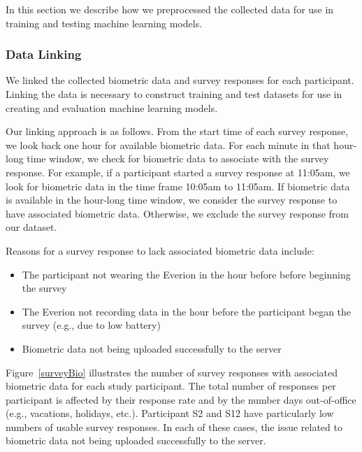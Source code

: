 In this section we describe how we preprocessed the collected data for use in training and testing machine learning models.

\subsubsection{Data Linking}

We linked the collected biometric data and survey responses for each participant. Linking the data is necessary to construct training and test datasets for use in creating and evaluation machine learning models.

Our linking approach is as follows. From the start time of each survey response, we look back one hour for available biometric data. For each minute in that hour-long time window, we check for biometric data to associate with the survey response. For example, if a participant started a survey response at 11:05am, we look for biometric data in the time frame 10:05am to 11:05am. If biometric data is available in the hour-long time window, we consider the survey response to have associated biometric data. Otherwise, we exclude the survey response from our dataset.

Reasons for a survey response to lack associated biometric data include:
\begin{itemize}
\item The participant not wearing the Everion in the hour before before beginning the survey
\item The Everion not recording data in the hour before the participant began the survey (e.g., due to low battery)
\item Biometric data not being uploaded successfully to the server
\end{itemize}

Figure~\ref{surveyBio} illustrates the number of survey responses with associated biometric data for each study participant. 
The total number of responses per participant is affected by their response rate and by the number days out-of-office (e.g., vacations, holidays, etc.). 
Participant S2 and S12 have particularly low numbers of usable survey responses. In each of these cases, the issue related to biometric data not being uploaded successfully to the server.

